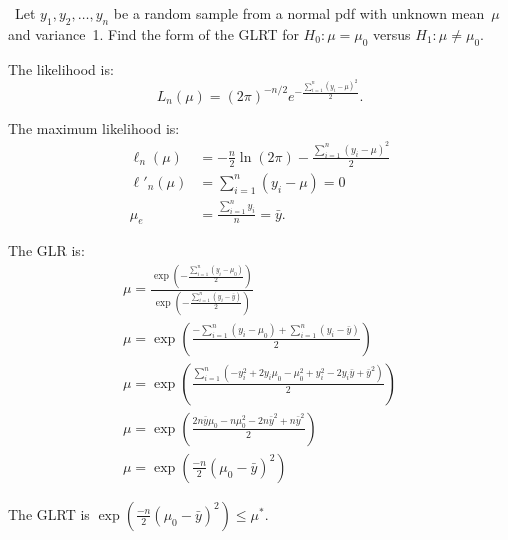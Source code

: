 \begin{problem}
  ~Let ${y_1,y_2,\ldots,y_n}$ be a random sample from a normal pdf with unknown mean~$\mu$ and variance~1.  Find the form of the GLRT for ${H_0: \mu = \mu_0}$ versus ${H_1: \mu \ne \mu_0}$.
\end{problem}

The likelihood is:
\begin{equation}
  L_{n}(\mu) = \left( 2 \pi \right)^{-n/2} e^{-\frac{\sum_{i=1}^{n}(y_i - \mu)^2}{2}} \text{.}
\end{equation}

The maximum likelihood is:
\begin{align}
  \ell_{n}(\mu)  &= -\frac{n}{2} \ln(2\pi) - \frac{\sum_{i=1}^{n} (y_i - \mu)^2}{2} \\
  \ell'_{n}(\mu) &=  \sum_{i=1}^{n} (y_i - \mu) = 0 \\
           \mu_e &= \frac{\sum_{i=1}^{n} y_i}{n} = \bar{y} \text{.}
\end{align}

The GLR is:
\begin{align}
  \mu = \frac{\exp\left( -\frac{\sum_{i=1}^{n} (y_i - \mu_0)}{2} \right)}{\exp\left( -\frac{\sum_{i=1}^{n} (y_i - \bar{y})}{2} \right)} \\
  \mu = \exp\left( \frac{ - \sum_{i=1}^{n} (y_i - \mu_0) + \sum_{i=1}^{n} (y_i - \bar{y})}{2} \right) \\
  \mu = \exp\left( \frac{\sum_{i=1}^{n} (-y_{i}^{2} + 2y_i \mu_0  - \mu^2_0 + y^2_i - 2y_i \bar{y}  + \bar{y}^2)}{2} \right) \\
  \mu = \exp\left( \frac{2n \bar{y} \mu_0  - n\mu^2_0 - 2n\bar{y}^2 + n\bar{y}^2}{2} \right) \\
  \mu = \exp\left(\frac{-n}{2} (\mu_0 - \bar{y})^2 \right)
\end{align}

The GLRT is ${\exp\left(\frac{-n}{2} (\mu_0 - \bar{y})^2 \right) \leq \mu^{*}}$.
